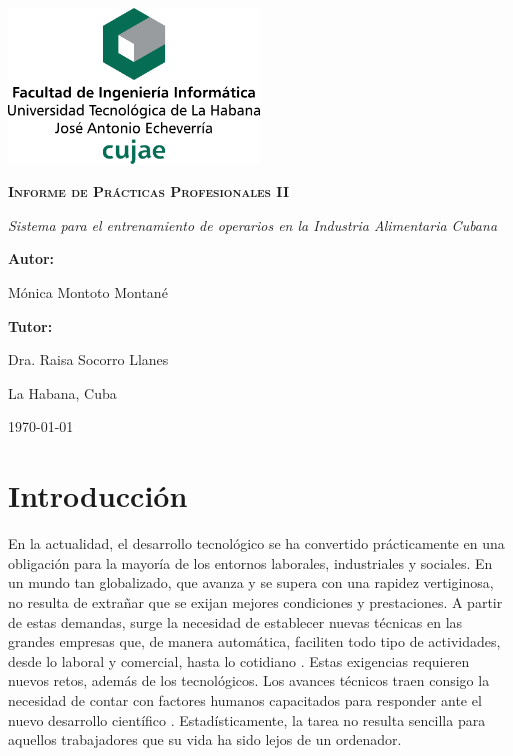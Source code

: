 \documentclass[12pt,a4paper]{report}
\begin{document}
\begin{titlepage}
\centering
{\includegraphics[width=0.5\textwidth]{imagen/cujae}\par}
\vspace{4cm}
{\bfseries\scshape\Huge Informe de Prácticas Profesionales II \par}
\vspace{1cm}
{\itshape\Large Sistema para el entrenamiento de operarios en la Industria Alimentaria Cubana \par}
\vspace{4cm}
{\bfseries\Large Autor:} { \Large Mónica Montoto Montané \par}
{\bfseries\Large Tutor: }{\Large Dra. Raisa Socorro Llanes \par}
\vfill
{\Large La Habana, Cuba \par}
\vspace{0.3cm}
\small{\mifecha\today}
\end{titlepage}

\chapter*{Introducción}
En la actualidad, el desarrollo tecnológico se ha convertido prácticamente en una obligación para la mayoría de los entornos laborales, industriales y sociales. En un mundo tan globalizado, que avanza y se supera con una rapidez vertiginosa, no resulta de extrañar que se exijan mejores condiciones y prestaciones. A partir de estas demandas, surge la necesidad de establecer nuevas técnicas en las grandes empresas que, de manera automática, faciliten todo tipo de actividades, desde lo laboral y comercial, hasta lo cotidiano \cite{avanceTecnologico}.
Estas exigencias requieren nuevos retos, además de los tecnológicos. Los avances técnicos traen consigo la necesidad de contar con factores humanos capacitados para responder ante el nuevo desarrollo científico \cite{invstCibernCuba}. Estadísticamente, la tarea no resulta sencilla para aquellos trabajadores que su vida ha sido lejos de un ordenador.
\end{document}
